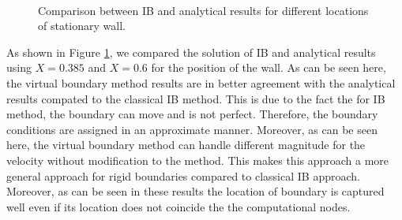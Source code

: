 \begin{figure}[h]
{	}
	\quad
	\\
	\quad
	\caption{Comparison between IB and analytical results for different locations of stationary wall.}
	\label{fig:C3_peskinResults}
\end{figure}

As shown in Figure \ref{fig:C3_peskinResults}, we compared the solution of IB and analytical results using $X=0.385$ and $X=0.6$ for the position of the wall. As can be seen here, the virtual boundary method results are in better agreement with the analytical results compated to the classical IB method. This is due to the fact the for IB method, the boundary can move and is not perfect. Therefore, the boundary conditions are assigned in an approximate manner. Moreover, as can be seen here, the virtual boundary method can handle different magnitude for the velocity without modification to the method. This makes this approach a more general approach for rigid boundaries compared to classical IB approach. Moreover, as can be seen in these results the location of boundary is captured well even if its location does not coincide the the computational nodes.


